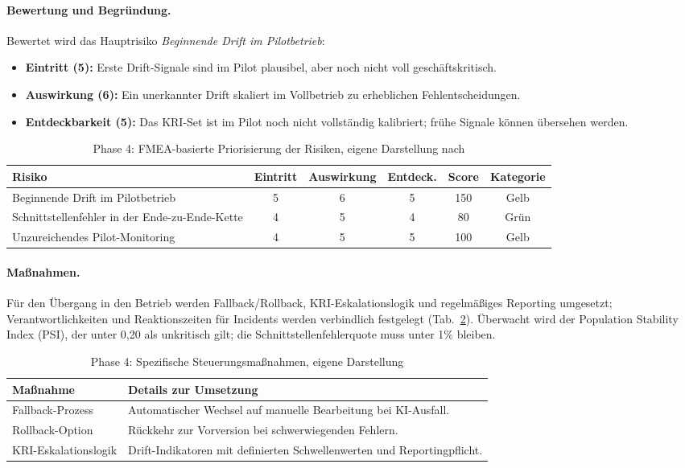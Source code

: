 \paragraph*{Bewertung und Begründung.}
Bewertet wird das Hauptrisiko \textit{Beginnende Drift im Pilotbetrieb}:
\begin{itemize}
  \item \textbf{Eintritt (5):} Erste Drift-Signale sind im Pilot plausibel, aber noch nicht voll geschäftskritisch.
  \item \textbf{Auswirkung (6):} Ein unerkannter Drift skaliert im Vollbetrieb zu erheblichen Fehlentscheidungen.
  \item \textbf{Entdeckbarkeit (5):} Das KRI-Set ist im Pilot noch nicht vollständig kalibriert; frühe Signale können übersehen werden.
\end{itemize}

\begin{table}[!htbp]
\centering
\begin{tabular}{|p{5.5cm}|c|c|c|c|c|}
\hline
\textbf{Risiko} & \textbf{Eintritt} & \textbf{Auswirkung} & \textbf{Entdeck.} & \textbf{Score} & \textbf{Kategorie} \\
\hline
Beginnende Drift im Pilotbetrieb & 5 & 6 & 5 & 150 & Gelb \\
Schnittstellenfehler in der Ende-zu-Ende-Kette & 4 & 5 & 4 & 80 & Grün \\
Unzureichendes Pilot-Monitoring & 4 & 5 & 5 & 100 & Gelb \\
\hline
\end{tabular}
\caption{Phase 4: FMEA-basierte Priorisierung der Risiken, eigene Darstellung nach \cite{Bundesministerium_2018}}
\label{tab:cs1_phase4_risiken}
\end{table}

\paragraph*{Maßnahmen.}
Für den Übergang in den Betrieb werden Fallback/Rollback, KRI-Eskalationslogik und
regelmäßiges Reporting umgesetzt; Verantwortlichkeiten und Reaktionszeiten für Incidents
werden verbindlich festgelegt (Tab.~\ref{tab:cs1_phase4_massnahmen}).
Überwacht wird der Population Stability Index (PSI), der unter 0{,}20 als unkritisch gilt; die Schnittstellenfehlerquote muss unter 1\% bleiben.

\begin{table}[!htbp]
\centering
\begin{tabular}{|p{4cm}|p{8cm}|}
\hline
\textbf{Maßnahme} & \textbf{Details zur Umsetzung} \\
\hline
Fallback-Prozess & Automatischer Wechsel auf manuelle Bearbeitung bei KI-Ausfall. \\
Rollback-Option & Rückkehr zur Vorversion bei schwerwiegenden Fehlern. \\
KRI-Eskalationslogik & Drift-Indikatoren mit definierten Schwellenwerten und Reportingpflicht. \\
\hline
\end{tabular}
\caption{Phase 4: Spezifische Steuerungsmaßnahmen, eigene Darstellung}
\label{tab:cs1_phase4_massnahmen}
\end{table}

